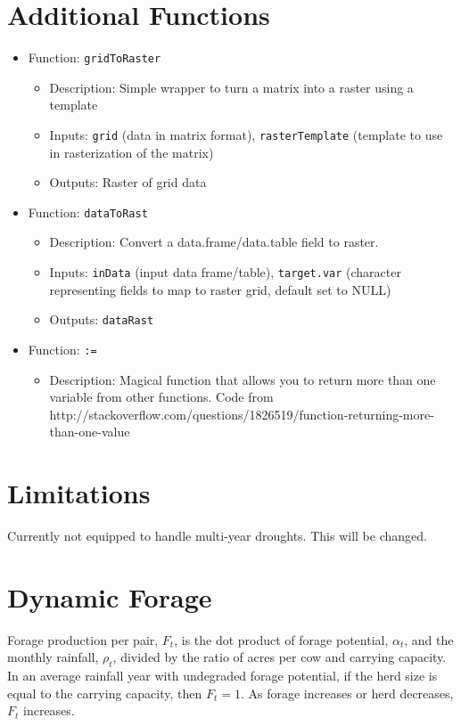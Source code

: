 \documentclass[11pt]{article}
\begin{document}
\section{Additional Functions}
\begin{itemize}
\item Function: \verb!gridToRaster!
	\begin{itemize}
	\item Description: Simple wrapper to turn a matrix into a raster using a template
    \item Inputs: \verb!grid! (data in matrix format), \verb!rasterTemplate! (template to use in rasterization of the matrix)
    \item Outputs: Raster of grid data
	\end{itemize}
\item Function: \verb!dataToRast!
	\begin{itemize}
	\item Description: Convert a data.frame/data.table field to raster.
	\item Inputs: \verb!inData! (input data frame/table), \verb!target.var! (character representing fields to map to raster grid, default set to NULL)
	\item Outputs: \verb!dataRast!
	\end{itemize}
\item Function: \verb!:=!
	\begin{itemize}
	\item Description: Magical function that allows you to return more than one variable from other functions. Code from http://stackoverflow.com/questions/1826519/function-returning-more-than-one-value
	\end{itemize}
\end{itemize}




\section{Limitations}
Currently not equipped to handle multi-year droughts. This will be changed. 


\section{Dynamic Forage}
Forage production per pair, $F_t$, is the dot product of forage potential, $\alpha_t$, and the monthly rainfall, $\rho_t$, divided by the ratio of acres per cow and carrying capacity. In an average rainfall year with undegraded forage potential, if the herd size is equal to the carrying capacity, then $F_t = 1$. As forage increases or herd decreases, $F_t$ increases.
\end{document}
